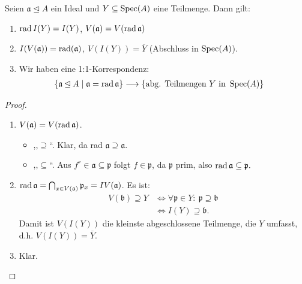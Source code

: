 \begin{prop}
\label{prop:nullstellensatz-primspektrum}
Seien $\mathfrak{a}\unlhd A$ ein Ideal und
  $Y\subseteq\operatorname{Spec}(A)$ eine Teilmenge. Dann gilt:
  \begin{enumerate}
  \item $\operatorname{rad} I(Y)=I(Y)$, $V(\mathfrak{a})=V(\operatorname{rad}\mathfrak{a})$
  \item $I(V(\mathfrak{a}))= \operatorname{rad}(\mathfrak{a})$,
    $V(I(Y))=\overline{Y}$ (Abschluss in $\operatorname{Spec}(A)$).
  \item Wir haben eine 1:1-Korrespondenz:
    \begin{align*}
      \{\mathfrak{a} \unlhd A\mid\mathfrak{a}=\operatorname{rad}\mathfrak{a}\}
      & \longrightarrow\{\text{abg. Teilmengen }Y\text{ in }\operatorname{Spec}(A)\}
    \end{align*}
  \end{enumerate}
\end{prop}
\begin{proof} \mbox{}
  \begin{enumerate}
  \item $V(\mathfrak{a})=V(\operatorname{rad}\mathfrak{a})$.
    \begin{itemize}
    \item ,,$\supseteq$``. Klar, da rad
      $\mathfrak{a}\supseteq\mathfrak{a}$.
    \item ,,$\subseteq$``. Aus $f^{r}\in\mathfrak{a}\subseteq\mathfrak{p}$
      folgt $f\in\mathfrak{p}$, da $\mathfrak{p}$ prim, also $\operatorname{rad}\mathfrak{a}\subseteq\mathfrak{p}.$
    \end{itemize}
  \item $\operatorname{rad}\mathfrak{a}=\bigcap_{x\in
      V(\mathfrak{a})}\mathfrak{p}_{x}=IV(\mathfrak{a})$.  Es ist:
    \begin{align*}
      V(\mathfrak{b})\supseteq Y & \Leftrightarrow \forall\mathfrak{p}\in Y:\
                                   \mathfrak{p}\supseteq\mathfrak{b}\\
                                 & \Leftrightarrow
                                   I(Y)\supseteq\mathfrak{b}.
    \end{align*} Damit ist $V(I(Y))$ die kleinste abgeschlossene
    Teilmenge, die $Y$ umfasst, d.h. $V(I(Y))=\overline{Y}$.
  \item Klar.
  \end{enumerate}
\end{proof}
